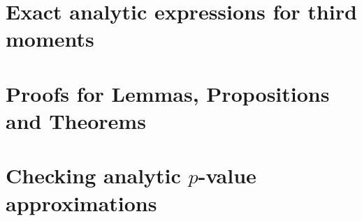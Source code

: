 \documentclass[arxiv, preprint]{imsart}
\numberwithin{equation}{section}
\theoremstyle{plain}
\begin{document}
%

\section{Exact analytic expressions for third moments}\label{app:extra}

\section{Proofs for Lemmas, Propositions and Theorems}\label{app:Proofs}

%
%
%

\section{Checking analytic $p$-value approximations}  \label{app:CV}

%
\end{document}
